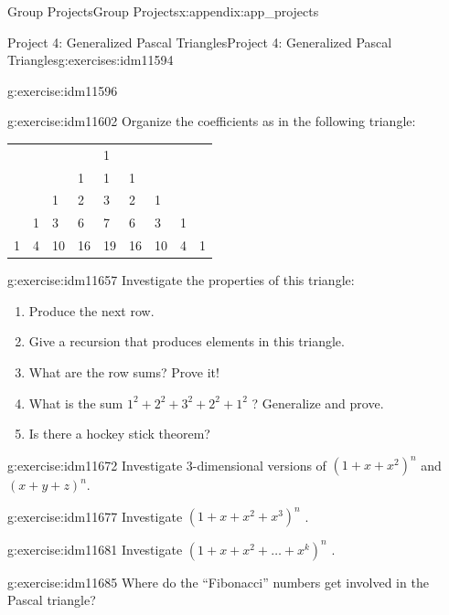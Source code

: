 \documentclass[oneside,10pt,]{book}
\numberwithin{equation}{chapter}
\begin{document}
\begin{appendixptx}{Group Projects}{}{Group Projects}{}{}{x:appendix:app_projects}
\begin{exercises-section-numberless}{Project 4: Generalized Pascal Triangles}{}{Project 4: Generalized Pascal Triangles}{}{}{g:exercises:idm11594}
\begin{divisionexercise}{1}{}{}{g:exercise:idm11596}
\end{divisionexercise}%
\begin{divisionexercise}{2}{}{}{g:exercise:idm11602}%
Organize the coefficients as in the following triangle:%
\begin{sidebyside}{1}{0.1}{0.1}{0}%
\begin{sbspanel}{0.8}%
{\centering%
\begin{tabular}{lllllllll}
&&&&1&&&&\tabularnewline[0pt]
&&&1&1&1&&&\tabularnewline[0pt]
&&1&2&3&2&1&&\tabularnewline[0pt]
&1&3&6&7&6&3&1&\tabularnewline[0pt]
1&4&10&16&19&16&10&4&1
\end{tabular}
\par}
\end{sbspanel}%
\end{sidebyside}%
\end{divisionexercise}%
\begin{divisionexercise}{3}{}{}{g:exercise:idm11657}%
Investigate the properties of this triangle:%
\begin{enumerate}[label=(\alph*)]
\item{}Produce the next row.%
\item{}Give a recursion that produces elements in this triangle.%
\item{}What are the row sums? Prove it!%
\item{}What is the sum \(1^{2} + 2^{2} + 3^{2} + 2^{2} + 1^{2}\) ? Generalize and prove.%
\item{}Is there a hockey stick theorem?%
\end{enumerate}
%
\end{divisionexercise}%
\begin{divisionexercise}{4}{}{}{g:exercise:idm11672}%
Investigate 3-dimensional versions of \(\left( 1 + x + x^{2} \right)^{n}\) and \(\left( x + y + z \right)^{n}.\)%
\end{divisionexercise}%
\begin{divisionexercise}{5}{}{}{g:exercise:idm11677}%
Investigate \(\left( 1 + x + x^{2} + x^{3} \right)^{n}\) .%
\end{divisionexercise}%
\begin{divisionexercise}{6}{}{}{g:exercise:idm11681}%
Investigate \(\left( 1 + x + x^{2} + \ldots + x^{k} \right)^{n}\) .%
\end{divisionexercise}%
\begin{divisionexercise}{7}{}{}{g:exercise:idm11685}%
Where do the ``Fibonacci'' numbers get involved in the Pascal triangle?%
\end{divisionexercise}%

\end{exercises-section-numberless}
\end{appendixptx}
\end{document}
